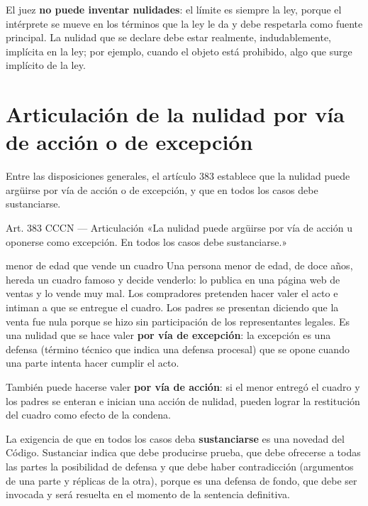 \documentclass[12pt,oneside]{book}
\begin{document}
\begin{important}
El juez \textbf{no puede inventar nulidades}: el límite es siempre la ley, porque el intérprete se mueve en los términos que la ley le da y debe respetarla como fuente principal. La nulidad que se declare debe estar realmente, indudablemente, implícita en la ley; por ejemplo, cuando el objeto está prohibido, algo que surge implícito de la ley.
\end{important}

\section{Articulación de la nulidad por vía de acción o de excepción}

Entre las disposiciones generales, el artículo 383 establece que la nulidad puede argüirse por vía de acción o de excepción, y que en todos los casos debe sustanciarse.

\begin{articulo}{Art. 383 CCCN --- Articulación}
«La nulidad puede argüirse por vía de acción u oponerse como excepción. En todos los casos debe sustanciarse.»
\end{articulo}

\begin{example}{menor de edad que vende un cuadro}
Una persona menor de edad, de doce años, hereda un cuadro famoso y decide venderlo: lo publica en una página web de ventas y lo vende muy mal. Los compradores pretenden hacer valer el acto e intiman a que se entregue el cuadro. Los padres se presentan diciendo que la venta fue nula porque se hizo sin participación de los representantes legales. Es una nulidad que se hace valer \textbf{por vía de excepción}: la excepción es una defensa (término técnico que indica una defensa procesal) que se opone cuando una parte intenta hacer cumplir el acto.

También puede hacerse valer \textbf{por vía de acción}: si el menor entregó el cuadro y los padres se enteran e inician una acción de nulidad, pueden lograr la restitución del cuadro como efecto de la condena.
\end{example}

La exigencia de que en todos los casos deba \textbf{sustanciarse} es una novedad del Código. Sustanciar indica que debe producirse prueba, que debe ofrecerse a todas las partes la posibilidad de defensa y que debe haber contradicción (argumentos de una parte y réplicas de la otra), porque es una defensa de fondo, que debe ser invocada y será resuelta en el momento de la sentencia definitiva.
\end{document}
